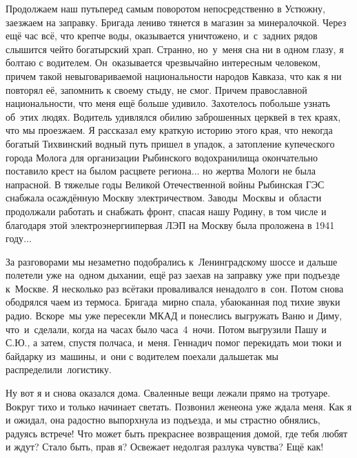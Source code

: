 Продолжаем наш путь\mdash перед самым поворотом непосредственно в Устюжну, заезжаем на заправку. Бригада лениво тянется в магазин за минералочкой. Через ещё час всё, что крепче воды, оказывается уничтожено, и~с~задних рядов слышится чей\sdash то богатырский храп. Странно, но~у~меня сна ни в одном глазу, я болтаю с водителем. Он~оказывается чрезвычайно интересным человеком, причем такой невыговариваемой национальности народов Кавказа, что как я ни повторял её, запомнить к своему стыду, не смог. Причем православной национальности, что меня ещё больше удивило. Захотелось побольше узнать об~этих людях. Водитель удивлялся обилию заброшенных церквей в тех краях, что мы проезжаем. Я рассказал ему краткую историю этого края, что некогда богатый Тихвинский водный путь пришел в упадок, а затопление купеческого города Молога для организации Рыбинского водохранилища окончательно поставило крест на былом расцвете региона$\ldots$ но жертва Мологи не была напрасной. В тяжелые годы Великой Отечественной войны Рыбинская ГЭС снабжала осаждённую Москву электричеством. Заводы~Москвы и~области продолжали работать и снабжать фронт, спасая нашу Родину, в том числе и благодаря этой электроэнергии\mdash первая ЛЭП на Москву была проложена в 1941 году$\ldots$ 

За разговорами мы незаметно подобрались к~Ленинградскому шоссе и дальше полетели уже на~одном дыхании, ещё раз заехав на заправку уже при подъезде к~Москве. Я несколько раз всё\sdash таки проваливался ненадолго в~сон. Потом снова ободрялся чаем из термоса. Бригада~мирно спала, убаюканная под тихие звуки радио. Вскоре~мы уже пересекли МКАД и понеслись выгружать Ваню и Диму, что~и~сделали, когда на часах было часа~4~ночи. Потом выгрузили Пашу и С.Ю., а затем, спустя полчаса, и~меня. Геннадич помог перекидать мои тюки и байдарку из~машины, и~они с водителем поехали дальше\mdash так мы распределили~логистику. 

Ну вот я и снова оказался дома. Сваленные вещи лежали прямо на тротуаре. Вокруг тихо и только начинает светать. Позвонил жене\mdash она уже ждала меня. Как я и ожидал, она радостно выпорхнула из подъезда, и мы страстно обнялись, радуясь встрече! Что может быть прекраснее возвращения домой, где тебя любят и ждут? Стало быть, прав я? Освежает недолгая разлука чувства? Ещё как! 

\begin{center}
\end{center}
